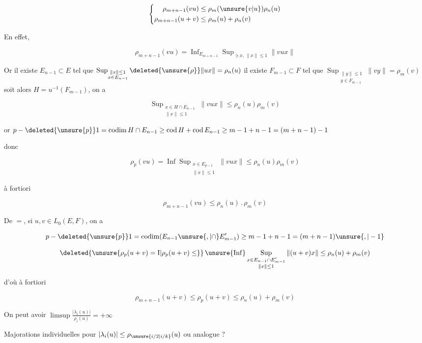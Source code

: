 
\[
\left\{\begin{aligned}
\rho_{m+n-1}(vu)&\leq\rho_m(\unsure{v|u})\rho_n(u)\\
\rho_{m+n-1}(u+v)&\leq\rho_m(u)+\rho_n(v)
\end{aligned}\right.
\]

En effet,

\[
\rho_{m+n-1}(vu)=\mathop{\mathrm{Inf}}_{E_{m+n-1}}
\mathop{\mathrm{Sup}}_{\ni x,\,\|x\|\leq1}\|vu x\|
\]


Or il existe $E_{n-1}\subset E$ tel que $\mathop{\mathrm{Sup}}_{\substack{\|x\|\leq1\\x\in E_{n-1}}}\deleted{\unsure{\rho}}\|ux\|=\rho_n(u)$  il existe $F_{m-1}\subset F$ tel que $\mathop{\mathrm{Sup}}_{\substack{\|y\|\leq1\\y\in F_{m-1}}}\|vy\|=\rho_m(v)$ soit alors $H=u^{-1}(F_{m-1})$, on a


\[
\mathop{\mathrm{Sup}}_{\substack{x\in H\cap E_{n-1}\\\|x\|\leq1}}\|vux\|\leq\rho_n(u)\rho_m(v)
\]

or $p-\deleted{\unsure{p}}1=\operatorname{codim}H\cap E_{n-1}\geq\operatorname{cod}H+\operatorname{cod}E_{n-1}\geq m-1+n-1=(m+n-1)-1$

donc

\[
\rho_p(vu)=\mathop{\mathrm{Inf}}\mathop{\mathrm{Sup}}_{\substack{x\in E_{p-1}\\\|x\|\leq1}}\|vux\|\leq\rho_n(u)\rho_m(v)
\]

à fortiori

\[
\boxed{\rho_{m+n-1}(vu)\leq\rho_n(u)\mathbin{.}\rho_m(v)}
\]

De $=$, si $u,v\in L_0(E,F)$, on a

\[
p-\deleted{\unsure{p}}1=\operatorname{codim}(E_{n-1}\unsure{,|\cap} E'_{m-1})\geq m-1+n-1=(m+n-1)\unsure{,|-1}
\]

\[
\deleted{\unsure{\rho_p(u+v)=\mathrm I|\rho_p(u+v)\leq}}
\mathop{\unsure{\mathrm{Inf}}}\mathop{\mathrm{Sup}}_{\substack{x\in E_{n-1}\cap E'_{m-1}\\\|x\|\leq1}}
\|(u+v)x\|\leq\rho_n(u)+\rho_m(v)
\]

d'où à fortiori

\[
\rho_{m+n-1}(u+v)\leq\rho_p(u+v)\leq\rho_n(u)+\rho_m(v)
\]

 On peut avoir $\limsup\frac{|\lambda_i(u)|}{\rho_i(u)}=+\infty$

Majorations individuelles pour $|\lambda_i(u)|\leq\rho_{\unsure{i/2|i/k}}(u)$ ou analogue ?
